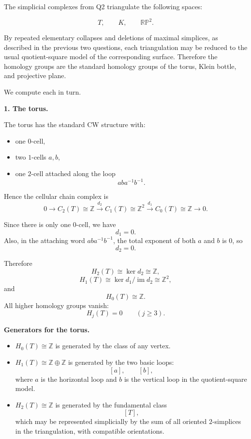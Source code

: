 \begin{solution}
The simplicial complexes from Q2 triangulate the following spaces:

\[
T,\qquad K,\qquad \mathbb{RP}^2.
\]

By repeated elementary collapses and deletions of maximal simplices, as described in the previous two questions, each triangulation may be reduced to the usual quotient-square model of the corresponding surface. Therefore the homology groups are the standard homology groups of the torus, Klein bottle, and projective plane.

We compute each in turn.

\par

\textbf{1. The torus.}

The torus has the standard CW structure with:

\begin{itemize}
	\item one \(0\)-cell,
	\item two \(1\)-cells \(a,b\),
	\item one \(2\)-cell attached along the loop
	\[
	aba^{-1}b^{-1}.
	\]
\end{itemize}

Hence the cellular chain complex is
\[
0 \longrightarrow C_2(T)\cong \mathbb Z
\xrightarrow{d_2}
C_1(T)\cong \mathbb Z^2
\xrightarrow{d_1}
C_0(T)\cong \mathbb Z
\longrightarrow 0.
\]

Since there is only one \(0\)-cell, we have
\[
d_1=0.
\]
Also, in the attaching word \(aba^{-1}b^{-1}\), the total exponent of both \(a\) and \(b\) is \(0\), so
\[
d_2=0.
\]

Therefore
\[
H_2(T)\cong \ker d_2 \cong \mathbb Z,
\]
\[
H_1(T)\cong \ker d_1/\operatorname{im} d_2 \cong \mathbb Z^2,
\]
and
\[
H_0(T)\cong \mathbb Z.
\]
All higher homology groups vanish:
\[
H_j(T)=0 \qquad (j\ge 3).
\]

\par

\textbf{Generators for the torus.}

\begin{itemize}
	\item \(H_0(T)\cong \mathbb Z\) is generated by the class of any vertex.
	\item \(H_1(T)\cong \mathbb Z\oplus \mathbb Z\) is generated by the two basic loops:
	\[
	[a],\qquad [b],
	\]
	where \(a\) is the horizontal loop and \(b\) is the vertical loop in the quotient-square model.
	\item \(H_2(T)\cong \mathbb Z\) is generated by the fundamental class
	\[
	[T],
	\]
	which may be represented simplicially by the sum of all oriented \(2\)-simplices in the triangulation, with compatible orientations.
\end{itemize}


\end{solution}
